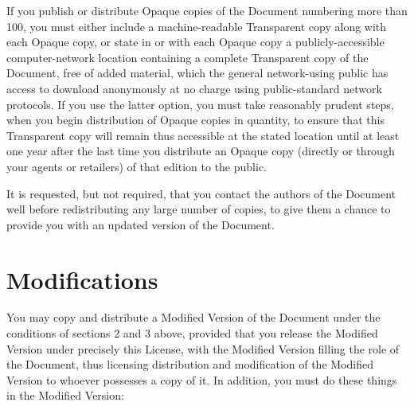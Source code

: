 If you publish or distribute Opaque copies of the Document numbering
more than 100, you must either include a machine-readable Transparent
copy along with each Opaque copy, or state in or with each Opaque copy
a publicly-accessible computer-network location containing a complete
Transparent copy of the Document, free of added material, which the
general network-using public has access to download anonymously at no
charge using public-standard network protocols.  If you use the latter
option, you must take reasonably prudent steps, when you begin
distribution of Opaque copies in quantity, to ensure that this
Transparent copy will remain thus accessible at the stated location
until at least one year after the last time you distribute an Opaque
copy (directly or through your agents or retailers) of that edition to
the public.

It is requested, but not required, that you contact the authors of the
Document well before redistributing any large number of copies, to give
them a chance to provide you with an updated version of the Document.


\section{Modifications}

You may copy and distribute a Modified Version of the Document under
the conditions of sections 2 and 3 above, provided that you release
the Modified Version under precisely this License, with the Modified
Version filling the role of the Document, thus licensing distribution
and modification of the Modified Version to whoever possesses a copy
of it.  In addition, you must do these things in the Modified Version:

